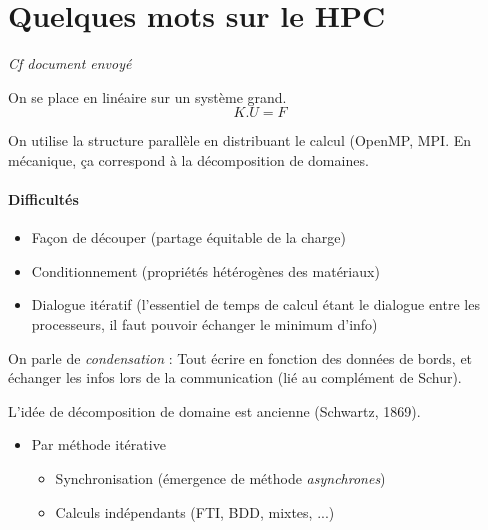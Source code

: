 \documentclass{article}
\begin{document}
\section{Quelques mots sur le HPC}
\textit{Cf document envoyé}

On se place en linéaire sur un système grand.
\[K.U=F\]

On utilise la structure parallèle en distribuant le calcul (OpenMP, MPI. En mécanique, ça correspond à la décomposition de domaines.

\paragraph{Difficultés}
\begin{itemize}
\item Façon de découper (partage équitable de la charge)
\item Conditionnement (propriétés hétérogènes des matériaux)
\item Dialogue itératif (l'essentiel de temps de calcul étant le dialogue entre les processeurs, il faut pouvoir échanger le minimum d'info)
\end{itemize}
On parle de \emph{condensation} : Tout écrire en fonction des données de bords, et échanger les infos lors de la communication (lié au complément de Schur).

L'idée de décomposition de domaine est ancienne (Schwartz, 1869).
\begin{itemize}
\item Par méthode itérative
\begin{itemize}
\item Synchronisation (émergence de méthode \emph{asynchrones})
\item Calculs indépendants (FTI, BDD, mixtes, ...)
\end{itemize}
\end{itemize}
\end{document}

